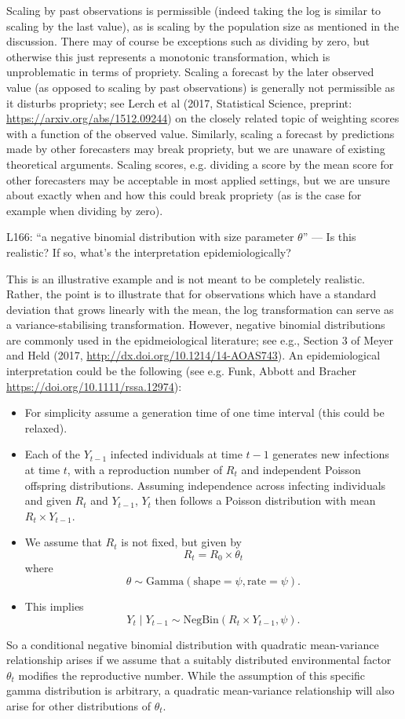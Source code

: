 \documentclass{article}
\newcommand{\black}{\color{black}}
\newcommand{\blue}{\color{blue}}
\begin{document}
Scaling by past observations is permissible (indeed taking the log is similar to scaling by the last value), as is scaling by the population size as mentioned in the discussion. There may of course be exceptions such as dividing by zero, but otherwise this just represents a monotonic transformation, which is unproblematic in terms of propriety. Scaling a forecast by the later observed value (as opposed to scaling by past observations) is generally not permissible as it disturbs propriety; see Lerch et al (2017, Statistical Science, preprint: \url{https://arxiv.org/abs/1512.09244}) on the closely related topic of weighting scores with a function of the observed value. Similarly, scaling a forecast by predictions made by other forecasters may break propriety, but we are unaware of existing theoretical arguments. Scaling scores, e.g. dividing a score by the mean score for other forecasters may be acceptable in most applied settings, but we are unsure about exactly when and how this could break propriety (as is the case for example when dividing by zero). 


\blue
L166: “a negative binomial distribution with size parameter $\theta$” — Is this realistic? If so, what’s the interpretation epidemiologically?

\black
This is an illustrative example and is not meant to be completely realistic. Rather, the point is to illustrate that for observations which have a standard deviation that grows linearly with the mean, the log transformation can serve as a variance-stabilising transformation. However, negative binomial distributions are commonly used in the epidmeiological literature; see e.g., Section 3 of Meyer and Held (2017, \url{http://dx.doi.org/10.1214/14-AOAS743}). An epidemiological interpretation could be the following (see e.g. Funk, Abbott and Bracher \url{https://doi.org/10.1111/rssa.12974}):
\begin{itemize}
    \item For simplicity assume a generation time of one time interval (this could be relaxed).
    \item Each of the $Y_{t - 1}$ infected individuals at time $t - 1$  generates new infections at time $t$, with a reproduction number of $R_t$ and independent Poisson offspring distributions. Assuming independence across infecting individuals and given $R_t$ and $Y_{t - 1}$, $Y_t$ then follows a Poisson distribution with mean $R_t \times Y_{t - 1}$.
    \item We assume that $R_t$ is not fixed, but given by
    $$
    R_t = R_0 \times \theta_t
    $$
    where
    $$
    \theta \sim \text{Gamma}(\text{shape} = \psi, \text{rate} = \psi).
    $$
    \item This implies
    $$
    Y_t \mid Y_{t - 1} \sim \text{NegBin}(R_t \times Y_{t - 1}, \psi).
    $$
\end{itemize}
So a conditional negative binomial distribution with quadratic mean-variance relationship arises if we assume that a suitably distributed environmental factor $\theta_t$ modifies the reproductive number. While the assumption of this specific gamma distribution is arbitrary, a quadratic mean-variance relationship will also arise for other distributions of $\theta_t$.
\end{document}
